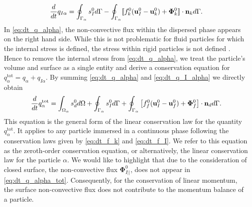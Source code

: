 \begin{equation}
    \frac{d}{dt}  q_{I\alpha}
    = \oint_{\Gamma_{\alpha}}  
        s_I^0
     d\Gamma
    - \oint_{\Gamma_{\alpha}} 
 \llbracket 
        f_k^0 (\textbf{u}_I^0 - \textbf{u}_k^0)
        + \mathbf{\Phi}_k^0
     \rrbracket \cdot \textbf{n}_k
     d\Gamma.
    \label{eq:dt_q_I_alpha}
\end{equation}
In \ref{eq:dt_q_alpha}, the non-convective flux within the dispersed phase appears on the right hand side. While this is not problematic for fluid particles for which the internal stress is defined, the stress within rigid particles is not defined \citep{batchelor1970stress}.
Hence to remove the internal stress from \ref{eq:dt_q_alpha}, we treat the particle's volume and surface as a single entity and derive a conservation equation for $q_\alpha^\text{tot} = q_\alpha + q_{I\alpha}$. 
By summing \ref{eq:dt_q_alpha} and \ref{eq:dt_q_I_alpha} we directly obtain 
\begin{equation}
    \frac{d}{dt}  q_\alpha^\text{tot}
    = 
    \int_{\Omega_{\alpha}}  s_d^0  d\Omega
    + \oint_{\Gamma_{\alpha}}  s_I^0  d\Gamma
    + \oint_{\Gamma_{\alpha}}  \left[
        f_f^0 (\textbf{u}_I^0-\textbf{u}_f^0) 
        + \mathbf{\Phi}_f^0 
        \right] \cdot \textbf{n}_d  d\Gamma. 
    \label{eq:dt_q_alpha_tot}
\end{equation}
This equation is the general form of the linear conservation law for the quantity $q_\alpha^\text{tot}$.
It applies to any particle immersed in a continuous phase following the conservation laws given by \ref{eq:dt_f_k} and \ref{eq:dt_f_I}.
We refer to this equation as the zeroth-order conservation equation, or alternatively, the linear conservation law for the particle $\alpha$.
We would like to highlight that due to the consideration of closed surface, the non-convective flux $\mathbf{\Phi}_{I||}^0$, does not appear in \ref{eq:dt_q_alpha_tot}.
Consequently, for the conservation of linear momentum, the surface non-convective flux does not contribute to the momentum balance of a particle.
